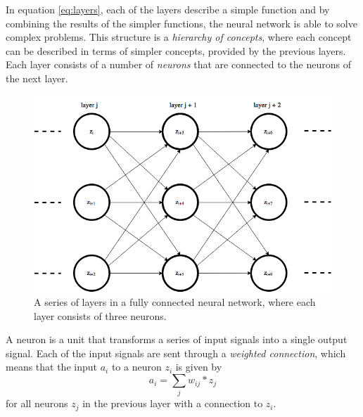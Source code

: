 \documentclass[11pt]{article}
\begin{document}
In equation \ref{eq:layers}, each of the layers describe a simple function
and by combining the results of the simpler functions, the neural network
is able to solve complex problems.
This structure is a \textit{hierarchy of concepts}, where each concept can be described in terms
of simpler concepts, provided by the previous layers.
Each layer consists of a number of \textit{neurons} that are connected to the
neurons of the next layer.
\begin{figure}[!h]
    \centering
    \includegraphics[width=12cm]{include/layers.png}
    \caption{A series of layers in a fully connected neural network, where each layer consists of three neurons.}
    \label{fig:layers}
\end{figure}

A neuron is a unit that transforms a series of input signals into a single output signal.
Each of the input signals are sent through a \textit{weighted connection}, which means
that the input $a_i$ to a neuron $z_i$ is given by
\begin{equation}
    a_i = \sum\limits_{j} w_{ij}* z_j
\end{equation}
for all neurons $z_j$ in the previous layer with a connection to $z_i$.
\end{document}

